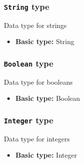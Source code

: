 \subsubsection{\texttt{String} type}
Data type for strings
\begin{itemize}
\item \textbf{Basic type:} String
\end{itemize}
\subsubsection{\texttt{Boolean} type}
Data type for booleans
\begin{itemize}
\item \textbf{Basic type:} Boolean
\end{itemize}
\subsubsection{\texttt{Integer} type}
Data type for integers
\begin{itemize}
\item \textbf{Basic type:} Integer
\end{itemize}
